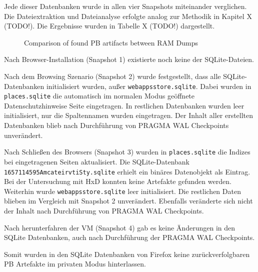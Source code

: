 Jede dieser Datenbanken wurde in allen vier Snapshots miteinander verglichen. Die Dateiextraktion und Dateianalyse erfolgte analog zur Methodik in Kapitel X (TODO!).
Die Ergebnisse wurden in Tabelle X (TODO!) dargestellt.

\begin{figure}[h!]
	\centerline{}
	\label{chart:final-criteria}  
	\caption{Comparison of found PB artifacts between RAM Dumps}
\end{figure}
Nach Browser-Installation (Snapshot 1) existierte noch keine der SQLite-Dateien.

Nach dem Browsing Szenario (Snapshot 2) wurde festgestellt, dass alle SQLite-Datenbanken 
initialisiert wurden, außer \texttt{webappsstore.sqlite}. Dabei wurden in \texttt{places.sqlite} die automatisch im normalen Modus geöffnete Datenschutzhinweise Seite eingetragen. 
In restlichen Datenbanken wurden leer initialisiert, nur die Spaltennamen wurden eingetragen.
Der Inhalt aller erstellten Datenbanken blieb nach Durchführung von PRAGMA WAL Checkpoints unverändert.

Nach Schließen des Browsers (Snapshot 3) wurden in \texttt{places.sqlite} die Indizes bei eingetragenen Seiten aktualisiert. Die SQLite-Datenbank \texttt{1657114595AmcateirvtiSty.sqlite} erhielt ein binäres Datenobjekt als Eintrag. Bei der Untersuchung mit HxD konnten keine Artefakte gefunden werden. Weiterhin wurde \texttt{webappsstore.sqlite} leer initialisiert. Die restlichen Daten blieben im Vergleich mit Snapshot 2 unverändert. Ebenfalls veränderte sich nicht der Inhalt nach Durchführung von PRAGMA WAL Checkpoints.

Nach herunterfahren der VM (Snapshot 4) gab es keine Änderungen in den SQLite Datenbanken, auch nach Durchführung der PRAGMA WAL Checkpoints.
	
Somit wurden in den SQLite Datenbanken von Firefox keine zurückverfolgbaren PB Artefakte im privaten Modus hinterlassen.


